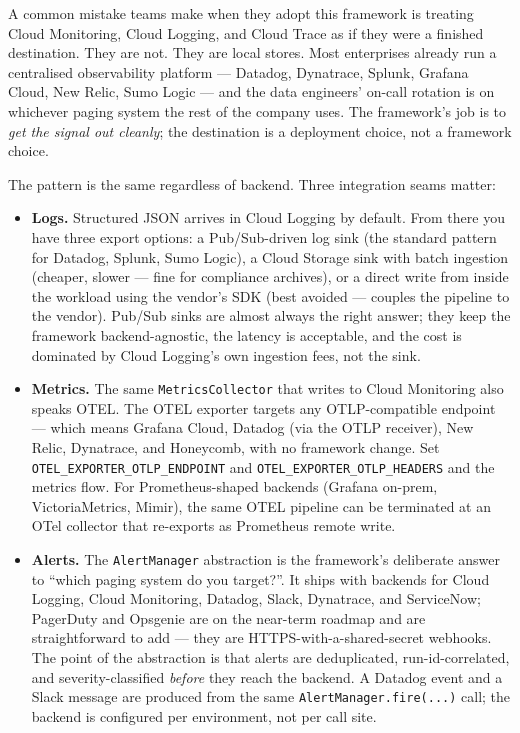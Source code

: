 \documentclass[
  11pt,
  british,
  oneside]{book}
\begin{document}
A common mistake teams make when they adopt this framework is treating
Cloud Monitoring, Cloud Logging, and Cloud Trace as if they were a
finished destination. They are not. They are local stores. Most
enterprises already run a centralised observability platform ---
Datadog, Dynatrace, Splunk, Grafana Cloud, New Relic, Sumo Logic --- and
the data engineers' on-call rotation is on whichever paging system the
rest of the company uses. The framework's job is to \emph{get the signal
out cleanly}; the destination is a deployment choice, not a framework
choice.

The pattern is the same regardless of backend. Three integration seams
matter:

\begin{itemize}
\item
  \textbf{Logs.} Structured JSON arrives in Cloud Logging by default.
  From there you have three export options: a Pub/Sub-driven log sink
  (the standard pattern for Datadog, Splunk, Sumo Logic), a Cloud
  Storage sink with batch ingestion (cheaper, slower --- fine for
  compliance archives), or a direct write from inside the workload using
  the vendor's SDK (best avoided --- couples the pipeline to the
  vendor). Pub/Sub sinks are almost always the right answer; they keep
  the framework backend-agnostic, the latency is acceptable, and the
  cost is dominated by Cloud Logging's own ingestion fees, not the sink.
\item
  \textbf{Metrics.} The same \texttt{MetricsCollector} that writes to
  Cloud Monitoring also speaks OTEL. The OTEL
  exporter targets any OTLP-compatible endpoint --- which means Grafana
  Cloud, Datadog (via the OTLP receiver), New Relic, Dynatrace, and
  Honeycomb, with no framework change. Set
  \texttt{OTEL\_EXPORTER\_OTLP\_ENDPOINT} and
  \texttt{OTEL\_EXPORTER\_OTLP\_HEADERS} and the metrics flow. For
  Prometheus-shaped backends (Grafana on-prem, VictoriaMetrics, Mimir),
  the same OTEL pipeline can be terminated at an OTel collector that
  re-exports as Prometheus remote write.
\item
  \textbf{Alerts.} The \texttt{AlertManager}
  abstraction is the framework's deliberate answer
  to ``which paging system do you target?''. It ships with backends for
  Cloud Logging, Cloud Monitoring, Datadog, Slack, Dynatrace, and
  ServiceNow; PagerDuty and Opsgenie
  are on the near-term roadmap and are straightforward to add --- they
  are HTTPS-with-a-shared-secret webhooks. The point of the abstraction
  is that alerts are deduplicated, run-id-correlated, and
  severity-classified \emph{before} they reach the backend. A Datadog
  event and a Slack message are produced from the same
  \texttt{AlertManager.fire(...)} call; the backend is configured per
  environment, not per call site.
\end{itemize}
\end{document}
